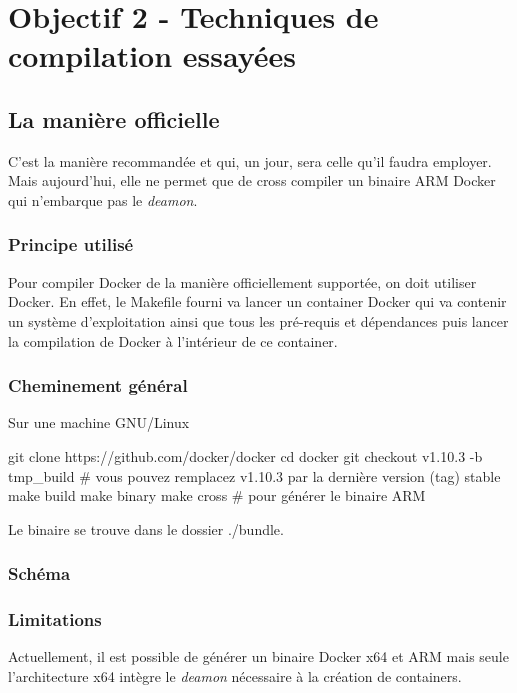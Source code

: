 \documentclass[11pt,a4paper,oneside]{article}
\begin{document}
\chapter{Objectif 2 - Techniques de compilation essayées}

\section{La manière officielle}

C'est la manière recommandée et qui, un jour, sera celle qu'il faudra
employer. Mais aujourd'hui, elle ne permet que de cross compiler un
binaire ARM Docker qui n'embarque pas le \emph{deamon}.

\subsection{Principe utilisé}

Pour compiler Docker de la manière officiellement supportée, on doit utiliser Docker. En effet, le Makefile fourni va lancer un container Docker qui va contenir un système d'exploitation ainsi que tous les pré-requis et dépendances puis lancer la compilation de Docker à l'intérieur de ce container.

\subsection{Cheminement général}

Sur une machine GNU/Linux

\begin{bashcode}
git clone https://github.com/docker/docker
cd docker
git checkout v1.10.3 -b tmp_build # vous pouvez remplacez v1.10.3 par la dernière version (tag) stable
make build
make binary
make cross # pour générer le binaire ARM
\end{bashcode}

Le binaire se trouve dans le dossier ./bundle.

\subsection{Schéma}

\subsection{Limitations}

Actuellement, il est possible de générer un binaire Docker x64 et ARM mais seule l'architecture x64 intègre le \emph{deamon} nécessaire à la création de containers.
\end{document}
